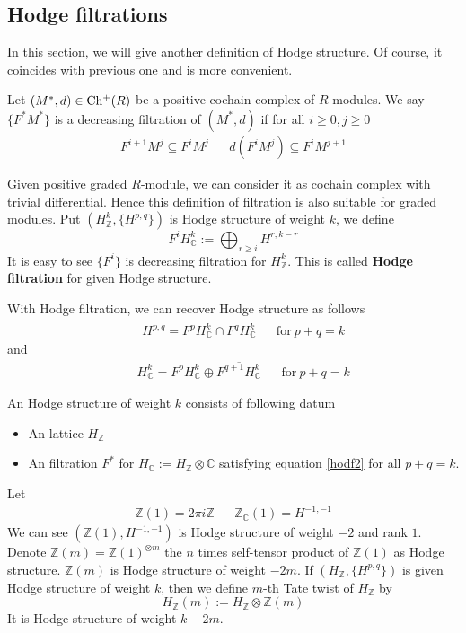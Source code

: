 \documentclass[11pt,oneside,a4paper]{amsart}
\begin{document}
\subsection{Hodge filtrations}
In this section, we will give another definition of Hodge structure. Of course, it coincides with previous one and is more convenient.
\begin{secdefn}
	Let $(M^*,d) \in \operatorname*{Ch^{+}}(R)$ be a positive cochain complex of $R$-modules. We say $\{F^*M^*\}$ is a decreasing filtration of $(M^*,d)$ if for all $i \geq 0 , j \geq 0$
	\[
	\begin{aligned}
	F^{i+1}M^j \subseteq F^{i}M^j& & d(F^iM^j) \subseteq F^iM^{j+1}
	\end{aligned}
	\]
\end{secdefn}
Given positive graded $R$-module, we can consider it as cochain complex with trivial differential. Hence this definition of filtration is also suitable for graded modules. Put $(H_\mathbb{Z}^k, \{H^{p,q}\})$ is Hodge structure of weight $k$, we define
\begin{equation}
	F^iH_{\mathbb{C}}^k:= \bigoplus_{r \geq i}H^{r,k-r}
\end{equation}
It is easy to see $\{F^i\}$ is decreasing filtration for $H_{\mathbb{Z}}^k$. This is called \textbf{Hodge filtration} for given Hodge structure.

With Hodge filtration, we can recover Hodge structure as follows
\begin{align}
	\label{hodf1}
	& &H^{p,q}= F^{p}H_{\mathbb{C}}^k \cap \overline{F^q H_{\mathbb{C}}^k} && \text{for}\ p+q=k
\end{align}
and 
\begin{align}
	\label{hodf2}
	& &H_\mathbb{C}^k= F^p H^k_\mathbb{C} \oplus  \overline{F^{q+1}H^k_{\mathbb{C}}}& &\text{for}\ p+q=k
\end{align}

\begin{secdefn}
	An Hodge structure of weight $k$ consists of following datum
	\begin{itemize}
		\item An lattice $H_\mathbb{Z}$
		\item An filtration $F^*$ for $H_\mathbb{C}:= H_\mathbb{Z} \otimes \mathbb{C}$ satisfying equation \ref{hodf2} for all $p+q=k$.
	\end{itemize}
\end{secdefn}

\begin{ex}
	Let 
	\begin{align}
		\mathbb{Z}(1)= 2\pi i \mathbb{Z}& & \mathbb{Z}_{\mathbb{C}}(1)= H^{-1,-1}
	\end{align}
	We can see $(\mathbb{Z}(1), H^{-1,-1})$ is Hodge structure of weight $-2$ and rank $1$. Denote $\mathbb{Z}(m)= \mathbb{Z}(1)^{\otimes m}$ the $n$   times self-tensor product of $\mathbb{Z}(1)$ as Hodge structure. $\mathbb{Z}(m)$ is Hodge structure of weight $-2m$. If $(H_\mathbb{Z}, \{ H^{p,q}\})$ is given Hodge structure of weight $k$, then we define $m$-th Tate twist of $H_\mathbb{Z}$ by
	\[
	H_\mathbb{Z}(m):= H_\mathbb{Z} \otimes \mathbb{Z}(m)
	\] 
	It is Hodge structure of weight $k-2m$. 
\end{ex}
\end{document}
